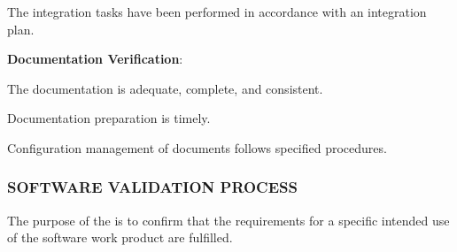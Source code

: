 \begin{adjustwidth}{2em}{0pt}
\begin{compactenum}
\begin{compactenum}
						\item The integration tasks have been performed in accordance with an integration plan.

					\end{compactenum}

					\item {\bf Documentation Verification}:

					\begin{compactenum}

						\item The documentation is adequate, complete, and consistent.

						\item Documentation preparation is timely.

						\item Configuration management of documents follows specified procedures.

					\end{compactenum}

				\end{compactenum}

			\end{adjustwidth}

		\newpage
		\subsubsection{SOFTWARE VALIDATION PROCESS\label{proc:software_validation_process}}

			\begin{adjustwidth}{2em}{0pt} 
				
				The purpose of the  is to confirm that the requirements for a specific intended use of the software work product are fulfilled.

			\end{adjustwidth}

